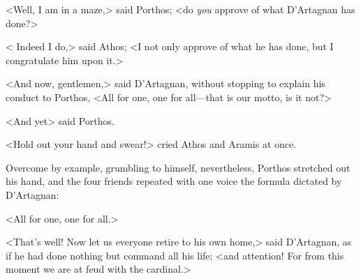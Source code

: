 <Well, I am in a maze,> said Porthos; <do \emph{you} approve of what D'Artagnan has done?> 

< Indeed I do,> said Athos; <I not only approve of what he has done, but I congratulate him upon it.> 

<And now, gentlemen,> said D'Artagnan, without stopping to explain his conduct to Porthos, <All for one, one for all—that is our motto, is it not?> 

<And yet\longdash> said Porthos. 

<Hold out your hand and swear!> cried Athos and Aramis at once. 

Overcome by example, grumbling to himself, nevertheless, Porthos stretched out his hand, and the four friends repeated with one voice the formula dictated by D'Artagnan: 

<All for one, one for all.> 

<That's well! Now let us everyone retire to his own home,> said D'Artagnan, as if he had done nothing but command all his life; <and attention! For from this moment we are at feud with the cardinal.> 